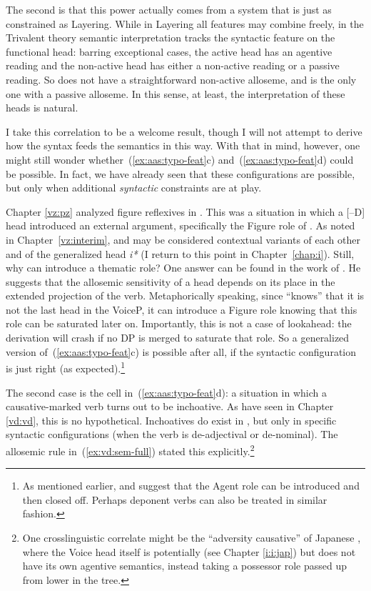 \label{r1:6:2}The second is that this power actually comes from a system that is just as constrained as Layering. While in Layering all features may combine freely, in the Trivalent theory semantic interpretation tracks the syntactic feature on the functional head: barring exceptional cases, the active head {\vd} has an agentive reading and the non-active head {\vz} has either a non-active reading or a passive reading. So {\vd} does not have a straightforward non-active alloseme, and {\vz} is the only one with a passive alloseme. In this sense, at least, the interpretation of these heads is natural.

I take this correlation to be a welcome result, though I will not attempt to derive how the syntax feeds the semantics in this way. With that in mind, however, one might still wonder whether~(\ref{ex:aas:typo-feat}c) and~(\ref{ex:aas:typo-feat}d) could be possible. In fact, we have already seen that these configurations are possible, but only when additional \emph{syntactic} constraints are at play.

Chapter \ref{vz:pz} analyzed figure reflexives in {\tnif}. This was a situation in which a [--D] head introduced an external argument, specifically the Figure role of {\pz}. As noted in Chapter~\ref{vz:interim}, {\pz} and {\vz} may be considered contextual variants of each other and of the generalized head \emph{i*} (I return to this point in Chapter~\ref{chap:i}). Still, why can {\pz} introduce a thematic role? One answer can be found in the work of \cite{wood15springer}. He suggests that the allosemic sensitivity of a head depends on its place in the extended projection of the verb. Metaphorically speaking, since {\pz} ``knows'' that it is not the last head in the VoiceP, it can introduce a Figure role knowing that this role can be saturated later on. Importantly, this is not a case of lookahead: the derivation will crash if no DP is merged to saturate that role. So a generalized version of~(\ref{ex:aas:typo-feat}c) is possible after all, if the syntactic configuration is just right (as expected).\footnote{As mentioned earlier, \cite{legate14} and \cite{akkus19jl} suggest that the Agent role can be introduced and then closed off. Perhaps deponent verbs can also be treated in similar fashion.}

The second case is the cell in~(\ref{ex:aas:typo-feat}d): a situation in which a causative-marked verb turns out to be inchoative. As have seen in Chapter \ref{vd:vd}, this is no hypothetical. Inchoatives do exist in {\thif}, but only in specific syntactic configurations (when the verb is de-adjectival or de-nominal). The allosemic rule in~(\ref{ex:vd:sem-full}) stated this explicitly.\footnote{One crosslinguistic correlate might be the ``adversity causative'' of Japanese \citep{pylkkanen08,woodmarantz17}, where the Voice head itself is potentially {\vd} (see Chapter \ref{i:i:jap}) but does not have its own agentive semantics, instead taking a possessor role passed up from lower in the tree.}

